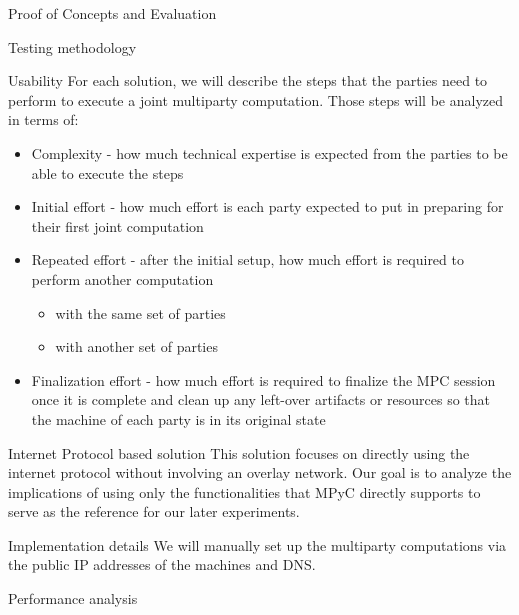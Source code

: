 \begin{frame}{Proof of Concepts and Evaluation}
\begin{block}{Testing methodology}
\begin{block}{Usability}
\protect\hypertarget{usability}{}
For each solution, we will describe the steps that the parties need to
perform to execute a joint multiparty computation. Those steps will be
analyzed in terms of:

\begin{itemize}
\tightlist
\item
  Complexity - how much technical expertise is expected from the parties
  to be able to execute the steps
\item
  Initial effort - how much effort is each party expected to put in
  preparing for their first joint computation
\item
  Repeated effort - after the initial setup, how much effort is required
  to perform another computation

  \begin{itemize}
  \tightlist
  \item
    with the same set of parties
  \item
    with another set of parties
  \end{itemize}
\item
  Finalization effort - how much effort is required to finalize the MPC
  session once it is complete and clean up any left-over artifacts or
  resources so that the machine of each party is in its original state
\end{itemize}
\end{block}
\end{block}

\begin{block}{Internet Protocol based solution}
\protect\hypertarget{internet-protocol-based-solution}{}
This solution focuses on directly using the internet protocol without
involving an overlay network. Our goal is to analyze the implications of
using only the functionalities that MPyC directly supports to serve as
the reference for our later experiments.

\begin{block}{Implementation details}
\protect\hypertarget{implementation-details}{}
We will manually set up the multiparty computations via the public IP
addresses of the machines and DNS.
\end{block}

\begin{block}{Performance analysis}
\protect\hypertarget{performance-analysis}{}
\end{block}


\end{block}
\end{frame}
